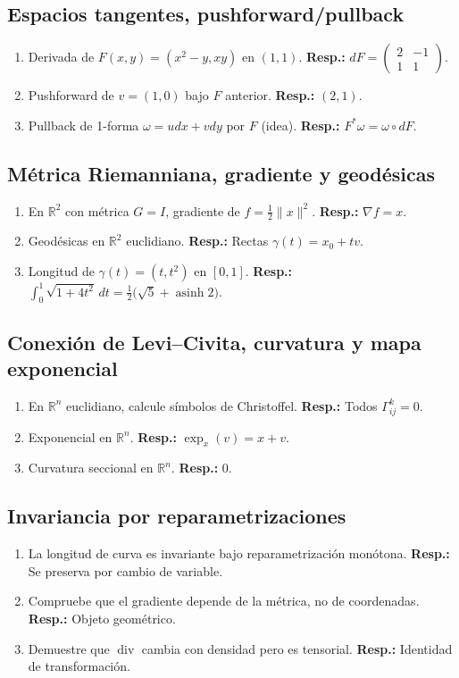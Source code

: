 	\subsection*{Espacios tangentes, pushforward/pullback}
	\begin{enumerate}
		\item Derivada de $F(x,y)=(x^2-y,xy)$ en $(1,1)$. \textbf{Resp.:} $dF=\begin{pmatrix}2&-1\\1&1\end{pmatrix}$.
		\item Pushforward de $v=(1,0)$ bajo $F$ anterior. \textbf{Resp.:} $(2,1)$.
		\item Pullback de 1-forma $\omega=udx+vdy$ por $F$ (idea). \textbf{Resp.:} $F^*\omega=\omega\circ dF$.
	\end{enumerate}
	
	\subsection*{Métrica Riemanniana, gradiente y geodésicas}
	\begin{enumerate}
		\item En $\mathbb R^2$ con métrica $G=I$, gradiente de $f=\tfrac12\|x\|^2$. \textbf{Resp.:} $\nabla f=x$.
		\item Geodésicas en $\mathbb R^2$ euclidiano. \textbf{Resp.:} Rectas $\gamma(t)=x_0+tv$.
		\item Longitud de $\gamma(t)=(t,t^2)$ en $[0,1]$. \textbf{Resp.:} $\int_0^1 \sqrt{1+4t^2}\,dt=\tfrac12\big(\sqrt{5}+\operatorname{asinh}2\big)$.
	\end{enumerate}
	
	\subsection*{Conexión de Levi--Civita, curvatura y mapa exponencial}
	\begin{enumerate}
		\item En $\mathbb R^n$ euclidiano, calcule símbolos de Christoffel. \textbf{Resp.:} Todos $\Gamma^k_{ij}=0$.
		\item Exponencial en $\mathbb R^n$. \textbf{Resp.:} $\exp_x(v)=x+v$.
		\item Curvatura seccional en $\mathbb R^n$. \textbf{Resp.:} 0.
	\end{enumerate}
	
	\subsection*{Invariancia por reparametrizaciones}
	\begin{enumerate}
		\item La longitud de curva es invariante bajo reparametrización monótona. \textbf{Resp.:} Se preserva por cambio de variable.
		\item Compruebe que el gradiente depende de la métrica, no de coordenadas. \textbf{Resp.:} Objeto geométrico.
		\item Demuestre que $\operatorname{div}$ cambia con densidad pero es tensorial. \textbf{Resp.:} Identidad de transformación.
	\end{enumerate}
	
